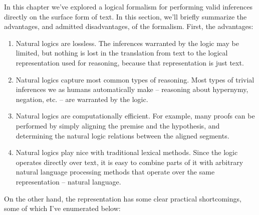 
In this chapter we've explored a logical formalism for performing valid inferences
  directly on the surface form of text.
In this section, we'll briefly summarize the advantages, and admitted disadvantages, of the formalism.
First, the advantages:

\begin{enumerate}
\item Natural logics are lossless. The inferences warranted by the logic may be limited, but
      nothing is lost in the translation from text to the logical representation used for
      reasoning, because that representation is just text.
\item Natural logics capture most common types of reasoning. Most types of trivial inferences we
      as humans automatically make -- reasoning about hypernymy, negation, etc. -- are warranted
      by the logic.
\item Natural logics are computationally efficient. For example, many proofs can be performed by simply
      aligning the premise and the hypothesis, and determining the natural logic relations between the
      aligned segments.
\item Natural logics play nice with traditional lexical methods. Since the logic operates directly over text,
      it is easy to combine parts of it with arbitrary natural language processing methods that operate over
      the same representation -- natural language.
\end{enumerate}

On the other hand, the representation has some clear practical shortcomings, some of which I've enumerated below:

